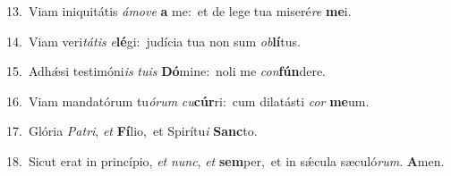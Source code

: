 {\numbfont\textcolor{\numbcolor}{13.}}~Viam iniquitátis \textit{á}\-\textit{mo}\textit{ve} \textbf{a} me:~\star et de lege tua miseré\textit{re} \textbf{me}\-i.\par
{\numbfont\textcolor{\numbcolor}{14.}}~Viam veri\-\textit{tá}\-\textit{tis} \textit{e}\-\textbf{lé}gi:~\star judícia tua non sum \textit{ob}\-\textbf{lí}tus.\par
{\numbfont\textcolor{\numbcolor}{15.}}~Adhǽsi testimóni\textit{is} \textit{tu}\-\textit{is} \textbf{Dó}\-mine:~\star noli me \textit{con}\-\textbf{fún}dere.\par
{\numbfont\textcolor{\numbcolor}{16.}}~Viam mandatórum tu\-\textit{ó}\-\textit{rum} \textit{cu}\-\textbf{cúr}ri:~\star cum dilatásti \textit{cor} \textbf{me}\-um.\par
{\numbfont\textcolor{\numbcolor}{17.}}~Glória \textit{Pa}\-\textit{tri}, \textit{et} \textbf{Fí}\-lio,~\star et Spirítu\textit{i} \textbf{Sanc}\-to.\par
{\numbfont\textcolor{\numbcolor}{18.}}~Sicut erat in princípio, \textit{et} \textit{nunc}\-, \textit{et} \textbf{sem}\-per,~\star et in sǽcula sæculó\-\textit{rum}\-. \textbf{A}\-men.\par
